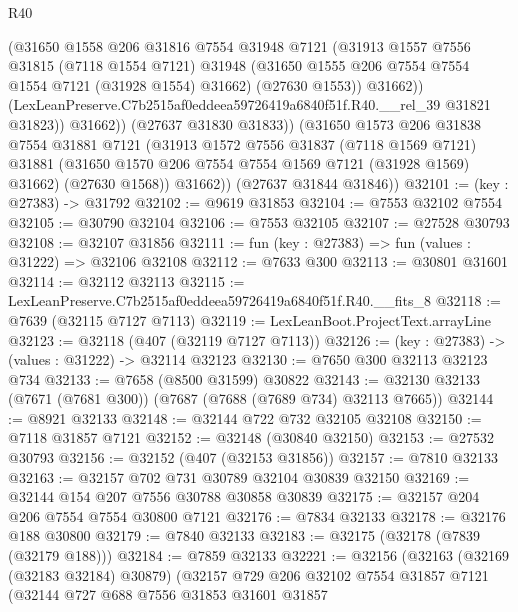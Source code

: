 \begin{lexlean}{R40}
\begin{coremodule}
                  (@31650
                    @1558
                    @206
                    @31816
                    @7554
                    @31948
                    @7121
                    (@31913
                      @1557
                      @7556
                      @31815
                      (@7118 @1554 @7121)
                      @31948
                      (@31650 @1555 @206 @7554 @7554 @1554 @7121 (@31928 @1554) @31662)
                      (@27630 @1553))
                    @31662))
                (LexLeanPreserve.C7b2515af0eddeea59726419a6840f51f.R40.__rel_39 @31821 @31823))
              @31662))
          (@27637 @31830 @31833))
        (@31650
          @1573
          @206
          @31838
          @7554
          @31881
          @7121
          (@31913
            @1572
            @7556
            @31837
            (@7118 @1569 @7121)
            @31881
            (@31650 @1570 @206 @7554 @7554 @1569 @7121 (@31928 @1569) @31662)
            (@27630 @1568))
          @31662))
      (@27637 @31844 @31846))
@32101 := (key : @27383) -> @31792
@32102 := @9619 @31853
@32104 := @7553 @32102 @7554
@32105 := @30790 @32104
@32106 := @7553 @32105
@32107 := @27528 @30793
@32108 := @32107 @31856
@32111 := fun (key : @27383) => fun (values : @31222) => @32106 @32108
@32112 := @7633 @300
@32113 := @30801 @31601
@32114 := @32112 @32113
@32115 := LexLeanPreserve.C7b2515af0eddeea59726419a6840f51f.R40.__fits_8
@32118 := @7639 (@32115 @7127 @7113)
@32119 := LexLeanBoot.ProjectText.arrayLine
@32123 := @32118 (@407 (@32119 @7127 @7113))
@32126 := (key : @27383) -> (values : @31222) -> @32114 @32123
@32130 := @7650 @300 @32113 @32123 @734
@32133 := @7658 (@8500 @31599) @30822
@32143 := @32130 @32133 (@7671 (@7681 @300)) (@7687 (@7688 (@7689 @734) @32113 @7665))
@32144 := @8921 @32133
@32148 := @32144 @722 @732 @32105 @32108
@32150 := @7118 @31857 @7121
@32152 := @32148 (@30840 @32150)
@32153 := @27532 @30793
@32156 := @32152 (@407 (@32153 @31856))
@32157 := @7810 @32133
@32163 := @32157 @702 @731 @30789 @32104 @30839 @32150
@32169 := @32144 @154 @207 @7556 @30788 @30858 @30839
@32175 := @32157 @204 @206 @7554 @7554 @30800 @7121
@32176 := @7834 @32133
@32178 := @32176 @188 @30800
@32179 := @7840 @32133
@32183 := @32175 (@32178 (@7839 (@32179 @188)))
@32184 := @7859 @32133
@32221 := @32156
    (@32163
      (@32169 (@32183 @32184) @30879)
      (@32157
        @729
        @206
        @32102
        @7554
        @31857
        @7121
        (@32144
          @727
          @688
          @7556
          @31853
          @31601
          @31857

\end{coremodule}
\end{lexlean}
